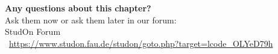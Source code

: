 \begin{frame}[c]
	\begin{center}
		{\bf Any questions about this chapter?}\\[0.5cm]
		Ask them now or ask them later in our forum: \\\bigskip
		StudOn Forum \\
		\faLink\ \url{https://www.studon.fau.de/studon/goto.php?target=lcode_OLYeD79h} \smallskip

	\end{center}
\end{frame}

